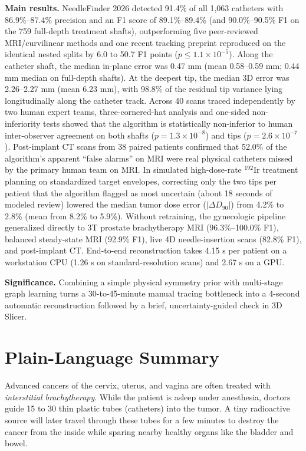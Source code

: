 \documentclass[
  11pt,
]{article}
\newcommand{\nfcaps}[1]{{\nfcapsfont #1}}
\renewenvironment{abstract}
  {\par\noindent{\small\nfcaps{Abstract}}\par\vspace{0.4\baselineskip}%
   \begingroup\small\setlength{\parindent}{0pt}\setlength{\parskip}{0.45\baselineskip}}
  {\par\endgroup
   \vspace{0.9\baselineskip}%
   \noindent{\color{nfrule}\rule{\linewidth}{0.4pt}}\par\vspace{0.4\baselineskip}}
\begin{document}
\begin{abstract}
\textbf{Main results.} NeedleFinder 2026 detected 91.4\% of all 1,063
catheters with 86.9\%--87.4\% precision and an F1 score of
89.1\%--89.4\% (and 90.0\%--90.5\% F1 on the 759 full-depth treatment
shafts), outperforming five peer-reviewed MRI/curvilinear methods and
one recent tracking preprint reproduced on the identical nested splits
by 6.0 to 50.7 F1 points (\(p \le 1.1 \times 10^{-5}\)). Along the
catheter shaft, the median in-plane error was 0.47 mm (mean 0.58--0.59
mm; 0.44 mm median on full-depth shafts). At the deepest tip, the median
3D error was 2.26--2.27 mm (mean 6.23 mm), with 98.8\% of the residual
tip variance lying longitudinally along the catheter track. Across 40
scans traced independently by two human expert teams, three-cornered-hat
analysis and one-sided non-inferiority tests showed that the algorithm
is statistically non-inferior to human inter-observer agreement on both
shafts (\(p = 1.3 \times 10^{-8}\)) and tips
(\(p = 2.6 \times 10^{-7}\)). Post-implant CT scans from 38 paired
patients confirmed that 52.0\% of the algorithm's apparent ``false
alarms'' on MRI were real physical catheters missed by the primary human
team on MRI. In simulated high-dose-rate \(^{192}\text{Ir}\) treatment
planning on standardized target envelopes, correcting only the two tips
per patient that the algorithm flagged as most uncertain (about 18
seconds of modeled review) lowered the median tumor dose error
(\(|\Delta D_{90}|\)) from 4.2\% to 2.8\% (mean from 8.2\% to 5.9\%).
Without retraining, the gynecologic pipeline generalized directly to 3T
prostate brachytherapy MRI (96.3\%--100.0\% F1), balanced steady-state
MRI (92.9\% F1), live 4D needle-insertion scans (82.8\% F1), and
post-implant CT. End-to-end reconstruction takes 4.15 s per patient on a
workstation CPU (1.26 s on standard-resolution scans) and 2.67 s on a
GPU.

\textbf{Significance.} Combining a simple physical symmetry prior with
multi-stage graph learning turns a 30-to-45-minute manual tracing
bottleneck into a 4-second automatic reconstruction followed by a brief,
uncertainty-guided check in 3D Slicer.
\end{abstract}

\section*{Plain-Language Summary}\label{plain-language-summary}

Advanced cancers of the cervix, uterus, and vagina are often treated
with \emph{interstitial brachytherapy}. While the patient is asleep
under anesthesia, doctors guide 15 to 30 thin plastic tubes (catheters)
into the tumor. A tiny radioactive source will later travel through
these tubes for a few minutes to destroy the cancer from the inside
while sparing nearby healthy organs like the bladder and bowel.
\end{document}
